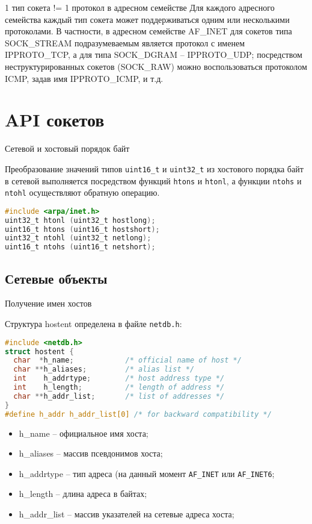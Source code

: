 \begin{frame}{1 тип сокета != 1 протокол в адресном семействе}
Для каждого адресного семейства каждый тип сокета может поддерживаться одним или несколькими протоколами. В частности, в адресном семействе AF\_INET для сокетов типа SOCK\_STREAM подразумеваемым является протокол с именем IPPROTO\_TCP, а для типа SOCK\_DGRAM -- IPPROTO\_UDP; посредством неструктурированных сокетов (SOCK\_RAW) можно воспользоваться протоколом ICMP, задав имя IPPROTO\_ICMP, и т.д. 
\end{frame}

\section{API сокетов}
\begin{frame}[fragile]{Сетевой и хостовый порядок байт}

Преобразование значений типов {\tt uint16\_t} и {\tt uint32\_t} из хостового порядка 
байт в сетевой выполняется посредством функций {\tt htons} и {\tt htonl},
а функции {\tt ntohs} и {\tt ntohl} осуществляют обратную операцию.

\begin{lstlisting}[language=C]
#include <arpa/inet.h>
uint32_t htonl (uint32_t hostlong);
uint16_t htons (uint16_t hostshort);
uint32_t ntohl (uint32_t netlong);
uint16_t ntohs (uint16_t netshort);
\end{lstlisting}
\end{frame}

\subsection{Сетевые объекты}
\begin{frame}[fragile]{Получение имен хостов}

Структура hostent определена в файле {\tt netdb.h}:
\scriptsize
\begin{lstlisting}[language=C]
#include <netdb.h>
struct hostent {
  char  *h_name;            /* official name of host */
  char **h_aliases;         /* alias list */
  int    h_addrtype;        /* host address type */
  int    h_length;          /* length of address */
  char **h_addr_list;       /* list of addresses */
}
#define h_addr h_addr_list[0] /* for backward compatibility */
\end{lstlisting}
\normalsize
\begin{itemize}
\item h\_name -- официальное имя хоста;
\item h\_aliases -- массив псевдонимов хоста;
\item h\_addrtype -- тип адреса (на данный момент {\tt AF\_INET} или {\tt AF\_INET6};
\item h\_length -- длина адреса в байтах;
\item h\_addr\_list -- массив указателей на сетевые адреса хоста;
\end{itemize}
\end{frame}

